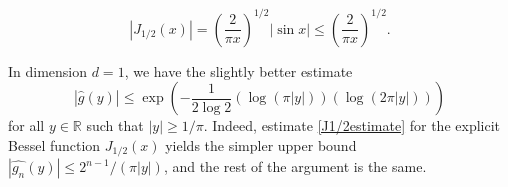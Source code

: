 \documentclass[10pt,a4paper]{amsart}
\begin{document}
\begin{equation}\label{J1/2estimate}
|J_{1/2}(x)| = \left( \frac{2}{\pi x} \right)^{1/2} |\sin x| \le \left( \frac{2}{\pi x} \right)^{1/2} .
\end{equation}

\begin{remark}\label{1dimremark} In dimension $d=1$, we have the slightly better estimate
\[ |\widehat{g}(y)| \le \exp \left( - \frac{1}{2 \log 2} \left( \log (\pi |y|) \right) \left( \log (2 \pi |y|) \right) \right) \]
for all $y \in \mathbb{R}$ such that $|y| \ge 1/\pi$. Indeed, estimate \eqref{J1/2estimate} for the explicit Bessel function $J_{1/2}(x)$ yields the simpler upper bound $|\widehat{g_n}(y)| \le 2^{n-1}/(\pi |y|)$, and the rest of the argument is the same.
\end{remark}
\end{document}

